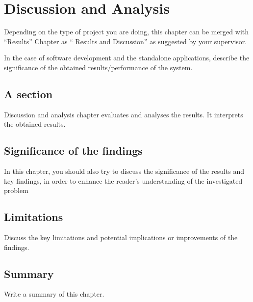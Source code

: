 \chapter{Discussion and Analysis}
\label{ch:evaluation}

Depending on the type of project you are doing, this chapter can be merged with ``Results'' Chapter as `` Results and Discussion'' as suggested by your supervisor. 

In the case of software development and the standalone applications, describe the significance of the obtained results/performance of the system. 



\section{A section}%
Discussion and analysis chapter evaluates and analyses the results. It interprets the obtained results. 



\section{Significance of the findings}
In this chapter, you should also try to discuss the significance of the results and key findings, in order to enhance the reader's understanding of the investigated problem

\section{Limitations} %
Discuss the key limitations and potential implications or improvements of the findings.
\section{Summary}
Write a summary of this chapter.